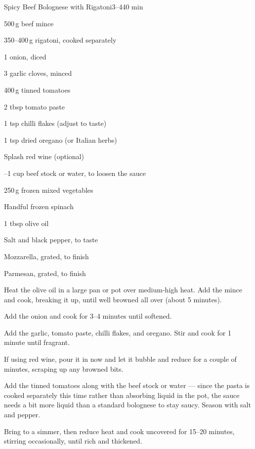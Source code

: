 \begin{recipebox}{Spicy Beef Bolognese with Rigatoni}{3--4}{40 min}
  \begin{ingredients}
    \item 500\,g beef mince
    \item 350--400\,g rigatoni, cooked separately
    \item 1 onion, diced
    \item 3 garlic cloves, minced
    \item 400\,g tinned tomatoes
    \item 2 tbsp tomato paste
    \item 1 tsp chilli flakes (adjust to taste)
    \item 1 tsp dried oregano (or Italian herbs)
    \item Splash red wine (optional)
    \item {}--1 cup beef stock or water, to loosen the sauce
    \item 250\,g frozen mixed vegetables
    \item Handful frozen spinach
    \item 1 tbsp olive oil
    \item Salt and black pepper, to taste
    \item Mozzarella, grated, to finish
    \item Parmesan, grated, to finish
  \end{ingredients}
  \begin{method}
    \item Heat the olive oil in a large pan or pot over medium-high heat. Add the mince and cook, breaking it up, until well browned all over (about 5 minutes).
    \item Add the onion and cook for 3--4 minutes until softened.
    \item Add the garlic, tomato paste, chilli flakes, and oregano. Stir and cook for 1 minute until fragrant.
    \item If using red wine, pour it in now and let it bubble and reduce for a couple of minutes, scraping up any browned bits.
    \item Add the tinned tomatoes along with the beef stock or water --- since the pasta is cooked separately this time rather than absorbing liquid in the pot, the sauce needs a bit more liquid than a standard bolognese to stay saucy. Season with salt and pepper.
    \item Bring to a simmer, then reduce heat and cook uncovered for 15--20 minutes, stirring occasionally, until rich and thickened.

\end{method}
\end{recipebox}
